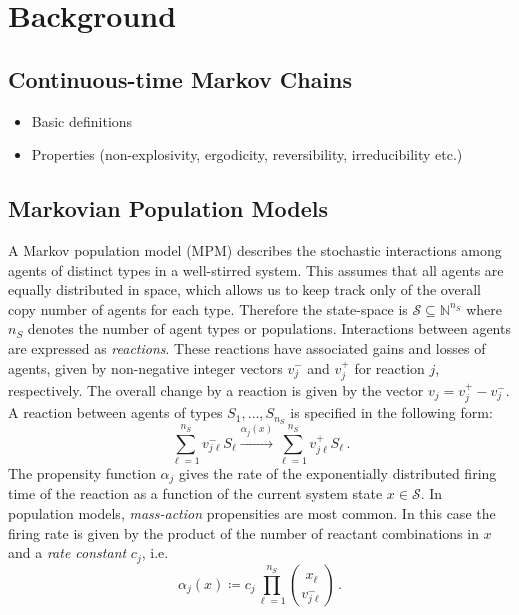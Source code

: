 \chapter{Background}

\section{Continuous-time Markov Chains}
\begin{itemize}
   \item Basic definitions
   \item Properties (non-explosivity, ergodicity, reversibility, irreducibility etc.)
\end{itemize}

\section{Markovian Population Models}
A Markov population model (MPM)
describes the stochastic interactions
among agents of distinct types in a well-stirred system.
This assumes that all agents are equally distributed in space, which
allows us to keep track only of the overall copy number of agents for each type.
Therefore the state-space is $\mathcal{S}\subseteq\mathbb{N}^{n_S}$ where
$n_S$ denotes the number of agent types or populations.
Interactions between agents are expressed as \emph{reactions}.
These reactions have associated
gains and losses of agents, given by non-negative integer vectors   
${v}_j^{-}$ and ${v}_j^{+}$ for reaction $j$, respectively. The overall change by a reaction is given by the vector $v_j = v_j^+ - v_j^-$.
A reaction between agents of types $S_1,\dots, S_{n_S}$ is specified in the following form:
\begin{equation}\label{eq:reaction}
    \sum_{\ell=1}^{n_S} v_{j\ell}^{-} S_\ell
    \xrightarrow{\alpha_j( x)}
    \sum_{\ell=1}^{n_S} v_{j\ell}^{+} S_\ell\,.
\end{equation}
The propensity function $\alpha_j$ gives the rate of the exponentially distributed firing
time of the reaction as a function of the current system state $x\in \mathcal{S}$.
In population models, \emph{mass-action} propensities are most common.
In this case the firing rate is given by the product of the number
of reactant combinations in $x$ and a
\emph{rate constant} $c_j$, i.e.
\begin{equation}\label{eq:stoch_mass_action}
    \alpha_j({x})\coloneqq c_j\prod_{\ell=1}^{n_S}\binom{x_\ell}{v_{j\ell}^{-}}\,.
\end{equation}
